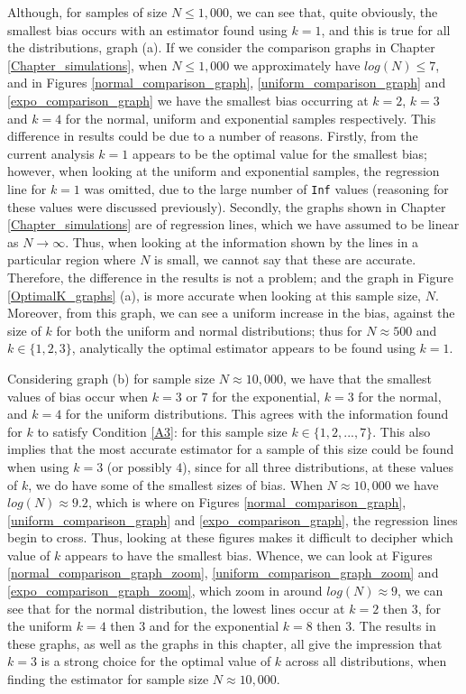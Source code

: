 \documentclass[12pt]{report}
\begin{document}
Although, for samples of size $N \leq 1,000$, we can see that, quite obviously, the smallest bias occurs with an estimator found using $k=1$, and this is true for all the distributions, graph (a). If we consider the comparison graphs in Chapter \ref{Chapter_simulations}, when $N \leq 1,000$ we approximately have $log(N) \leq 7$, and in Figures \ref{normal_comparison_graph}, \ref{uniform_comparison_graph} and \ref{expo_comparison_graph} we have the smallest bias occurring at $k=2$, $k=3$ and $k=4$ for the normal, uniform and exponential samples respectively. This difference in results could be due to a number of reasons. Firstly, from the current analysis $k=1$ appears to be the optimal value for the smallest bias; however, when looking at the uniform and exponential samples, the regression line for $k=1$ was omitted, due to the large number of \texttt{Inf} values (reasoning for these values were discussed previously). Secondly, the graphs shown in Chapter \ref{Chapter_simulations} are of regression lines, which we have assumed to be linear as $N \to \infty$. Thus, when looking at the information shown by the lines in a particular region where $N$ is small, we cannot say that these are accurate. Therefore, the difference in the results is not a problem; and the graph in Figure \ref{OptimalK_graphs} (a), is more accurate when looking at this sample size, $N$. Moreover, from this graph, we can see a uniform increase in the bias, against the size of $k$ for both the uniform and normal distributions; thus for $N \approx 500$ and $k \in \{1,2, 3\}$, analytically the optimal estimator appears to be found using $k=1$. 


Considering graph (b) for sample size $N \approx 10,000$, we have that the smallest values of bias occur when $k=3$ or $7$ for the exponential, $k=3$ for the normal, and $k=4$ for the uniform distributions. This agrees with the information found for $k$ to satisfy Condition \ref{A3}: for this sample size $k \in \{1, 2, ... , 7\}$. This also implies that the most accurate estimator for a sample of this size could be found when using $k =3$ (or possibly $4$), since for all three distributions, at these values of $k$, we do have some of the smallest sizes of bias. When $N \approx 10,000$ we have $log(N) \approx 9.2$, which is where on Figures  \ref{normal_comparison_graph}, \ref{uniform_comparison_graph} and \ref{expo_comparison_graph}, the regression lines begin to cross. Thus, looking at these figures makes it difficult to decipher which value of $k$ appears to have the smallest bias. Whence, we can look at  Figures \ref{normal_comparison_graph_zoom}, \ref{uniform_comparison_graph_zoom} and \ref{expo_comparison_graph_zoom}, which zoom in around $log(N) \approx 9$, we can see that for the normal distribution, the lowest lines occur at $k=2$ then $3$, for the uniform $k=4$ then $3$ and for the exponential $k=8$ then $3$. The results in these graphs, as well as the graphs in this chapter, all give the impression that $k=3$ is a strong choice for the optimal value of $k$ across all distributions, when finding the estimator for sample size $N \approx 10,000$.
\end{document}
